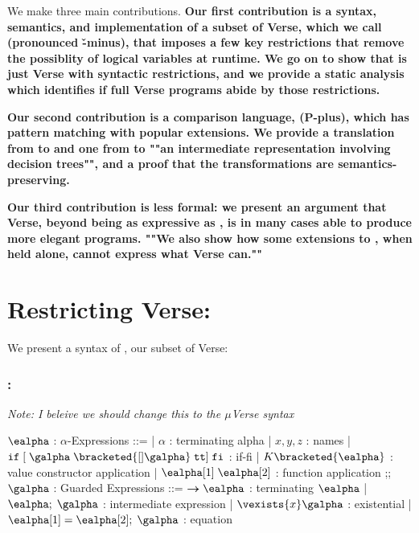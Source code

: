 \documentclass[]{article}
\begin{document}
We make three main contributions. \bf{Our first contribution} is a syntax,
semantics, and implementation of a subset of Verse, which we call {\VMinus}
(pronounced \v-minus), that imposes a few key restrictions that remove the
possiblity of logical variables at runtime. We go on
to show that {\VMinus} is just Verse with syntactic restrictions, and we provide a
static analysis which identifies if full Verse programs abide by those
restrictions. 


\bf{Our second contribution} is a comparison language, {\PPlus} (P-plus), which
has pattern matching with popular extensions. We provide  a translation from
{\PPlus} to {\VMinus} and one from {\VMinus} to ""an intermediate representation
involving decision trees"", and a proof that the transformations are
semantics-preserving. 

\bf{Our third contribution} is less formal: we present an argument that Verse,
beyond being as expressive as {\PPlus}, is in many cases able to produce more elegant
programs. ""We also show how some extensions to {\PPlus}, when held alone, cannot
express what Verse can.""

\section{Restricting Verse: {\VMinus}}

We present a syntax of {\VMinus}, our subset of Verse: 

\subsubsection{{\VMinus}:}
\it{Note: I beleive we should change this to the ${\mu}$Verse syntax}
\begin{center}
    \begin{bnf}
    $\ealpha$ : \textsf{$\alpha$-Expressions} ::=
    | $\alpha$ : terminating alpha
    | $x, y, z$ : names
    | $\tt{if}\; \tt{[}\; \galpha\; \bracketed{[] \galpha}\; tt{]}\; \tt{fi}$ : if-fi 
    | $K \bracketed{\ealpha}$ : value constructor application 
    | $\ealpha[1]\; \ealpha[2]$ : function application 
    ;;
    $\galpha$ : \textsf{Guarded Expressions} ::=  
    $\boldsymbol{\rightarrow}\ealpha$ : terminating $\ealpha$ 
    | $\ealpha;\; \galpha$ : intermediate expression 
    | $\vexists{x}\galpha$ : existential 
    | $\ealpha[1] = \ealpha[2];\; \galpha$ : equation 
    \end{bnf}
\end{center}
\end{document}
